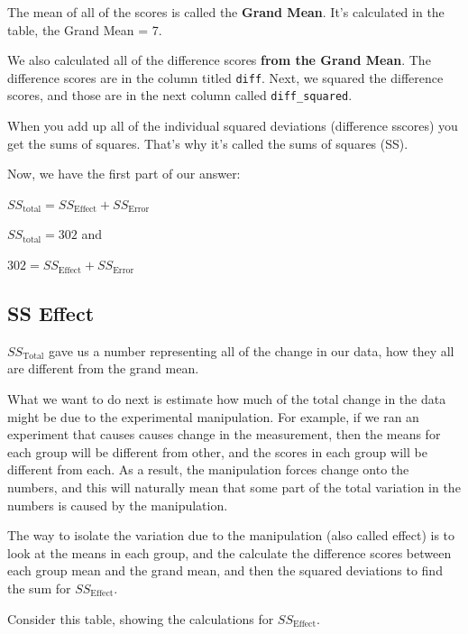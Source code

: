 \documentclass[
]{book}
\begin{document}
The mean of all of the scores is called the \textbf{Grand Mean}. It's calculated in the table, the Grand Mean = 7.

We also calculated all of the difference scores \textbf{from the Grand Mean}. The difference scores are in the column titled \texttt{diff}. Next, we squared the difference scores, and those are in the next column called \texttt{diff\_squared}.

When you add up all of the individual squared deviations (difference sscores) you get the sums of squares. That's why it's called the sums of squares (SS).

Now, we have the first part of our answer:

\(SS_\text{total} = SS_\text{Effect} + SS_\text{Error}\)

\(SS_\text{total} = 302\) and

\(302 = SS_\text{Effect} + SS_\text{Error}\)

\subsection{SS Effect}\label{ss-effect-1}

\(SS_\text{Total}\) gave us a number representing all of the change in our data, how they all are different from the grand mean.

What we want to do next is estimate how much of the total change in the data might be due to the experimental manipulation. For example, if we ran an experiment that causes causes change in the measurement, then the means for each group will be different from other, and the scores in each group will be different from each. As a result, the manipulation forces change onto the numbers, and this will naturally mean that some part of the total variation in the numbers is caused by the manipulation.

The way to isolate the variation due to the manipulation (also called effect) is to look at the means in each group, and the calculate the difference scores between each group mean and the grand mean, and then the squared deviations to find the sum for \(SS_\text{Effect}\).

Consider this table, showing the calculations for \(SS_\text{Effect}\).
\end{document}

